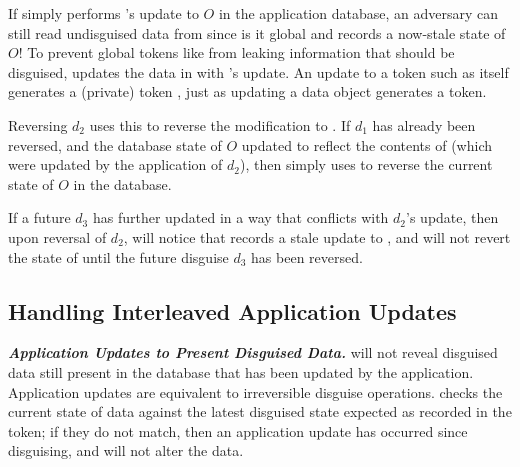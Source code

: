 If \sys simply performs 's update to $O$ in the application database, an adversary can still
read undisguised data from  since is it global and records a now-stale state of $O$!
%
%
To prevent global tokens like  from leaking information that should be disguised, \sys
updates the data in  with 's update. An update to a token such as 
itself generates a (private) token , just as updating a data object generates a token.

Reversing $d_2$ uses this  to reverse the modification to . 
If $d_1$ has already been reversed, and the database state of $O$ updated to reflect the contents
of  (which were updated by the application of $d_2$), 
then \sys simply uses  to reverse the current state of $O$ in the database. 

If a future $d_3$ has further updated  in a way that conflicts with $d_2$'s update,
then upon reversal of $d_2$, \sys will notice that  records a stale update to , 
and will not revert
the state of  until the future disguise $d_3$ has been reversed.




\iffalse
\subsection{Handling Interleaved Application Updates}
\noindent\textbf{\emph{Application Updates to Present Disguised Data.}}
\sys will not reveal disguised data still present in the database that has been updated by the
application. Application updates are equivalent to irreversible disguise operations.
\sys checks the current state of data against the latest disguised state
expected as recorded in the token; if they do not match, then an application update has occurred
since disguising, and \sys will not alter the data.

